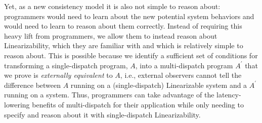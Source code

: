 

Yet, as a new consistency model it is also not simple to reason about:
programmers would need to learn about the new potential system behaviors and would need to learn to reason about them correctly.
Instead of requiring this heavy lift from programmers, we allow them to instead reason about Linearizability, which they are familiar with and which is relatively simple to reason about.
This is possible because we identify a sufficient set of conditions for transforming a single-dispatch program, $A$, into a multi-dispatch program $A^\prime$ that we prove is \textit{externally equivalent} to $A$, i.e., external observers cannot tell the difference between $A$ running on a (single-dispatch) Linearizable system and a $A^\prime$ running on a \mdl{} system.
Thus, programmers can take advantage of the latency-lowering benefits of multi-dispatch for their application while only needing to specify and reason about it with single-dispatch Linearizability.










